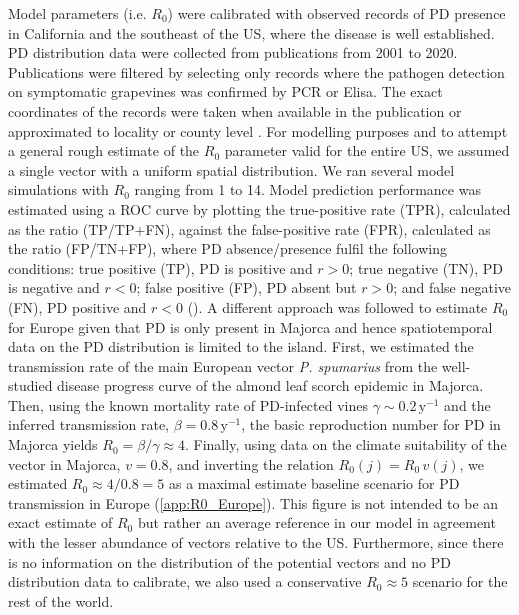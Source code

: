 Model parameters (i.e. $R_0$) were calibrated with observed records of PD
presence in California and the southeast of the US, where the disease is well
established. PD distribution data were collected from publications from 2001 to
2020. Publications were filtered by selecting only records where the pathogen
detection on symptomatic grapevines was confirmed by PCR or Elisa. The
exact coordinates of the records were taken when available in the publication
or approximated to locality or county level
\cite{Overall2015,Vanhove2019,Lieth2011,Anas2008,Hail2009,Wallingford2007,Myers2007,Albibi1998}.
For modelling purposes and to attempt a general rough estimate of the $R_0$
parameter valid for the entire US, we assumed a single vector with a uniform
spatial distribution. We ran several model simulations with $R_0$ ranging from
1 to 14.  Model prediction performance was estimated using a ROC curve by
plotting the true-positive rate (TPR), calculated as the ratio (TP/TP+FN),
against the false-positive rate (FPR), calculated as the ratio (FP/TN+FP),
where PD absence/presence fulfil the following conditions: true positive (TP),
PD is positive and $r>0$;  true negative (TN), PD is negative and $r<0$; false
positive (FP), PD absent but $r>0$; and false negative (FN), PD positive and
$r<0$ (\cite{jimenez2012insights}). A different approach was followed to
estimate $R_0$ for Europe given that PD is only present in Majorca and hence
spatiotemporal data on the PD distribution is limited to the island. First, we
estimated the transmission rate of the main European vector \textit{P.
    spumarius} from the well-studied disease progress curve of the almond leaf
scorch epidemic in Majorca. Then, using the known mortality rate of PD-infected
vines $\gamma\sim 0.2 \, \textrm{y}^{-1}$ and the inferred transmission rate,
$\beta=0.8 \, \textrm{y}^{-1}$, the basic reproduction number for PD in Majorca
yields $R_0=\beta/\gamma\approx4$. Finally, using data on the climate
suitability of the vector in Majorca, $v=0.8$, and inverting the relation
$R_0(j)=R_0\, v(j)$, we estimated $R_0\approx 4/0.8=5$ as a maximal estimate
baseline scenario for PD transmission in Europe (\cref{app:R0_Europe}). This
figure is not intended to be an exact estimate of $R_0$ but rather an average
reference in our model in agreement with the lesser abundance of vectors
relative to the US. Furthermore, since there is no information on the
distribution of the potential vectors and no PD distribution data to calibrate,
we also used a conservative $R_0 \approx 5$ scenario for the rest of the world.

